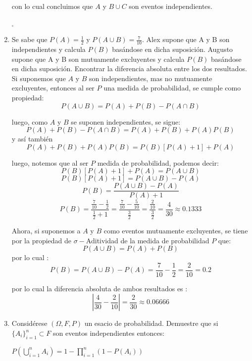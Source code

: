 \documentclass[12pt,a4paper]{report}
\begin{document}
\begin{enumerate}
{	con lo cual concluimos que $A$ y $B \cup C$ son eventos independientes.

	\begin{flushright}
		$_{\square}$
	\end{flushright}

	}

   \item {
   Se sabe que $P(A)= \frac{1}{2}$ y $P(A\cup B)=\frac{7}{10}$. Alex supone que A y B son independientes y calcula $P(B)$ basándose en dicha suposición. Augusto supone que A y B son mutuamente excluyentes y calcula $P(B)$ basándose en dicha suposición. Encontrar la diferencia absoluta entre los dos resultados.\\

   		Si suponemos que $A$ y $B$ son independientes, mas no mutuamente excluyentes,
		entonces al ser $P$ una medida de probabilidad, se cumple como propiedad:
			$$ P(A \cup B) = P(A) + P(B) - P(A \cap B)$$

		luego, como $A$ y $B$ se suponen independientes, se sigue:
			$$ P(A) + P(B) - P(A \cap B) = P(A) + P(B) + P(A)P(B) $$
		y así también
			$$ P(A) + P(B) + P(A)P(B) = P(B)[P(A) + 1] + P(A)  $$

		luego, notemos que al ser $P$ medida de probabilidad, podemos decir:
			$$ P(B)[P(A) + 1] + P(A) = P(A \cup B) $$
			$$ P(B)[P(A) + 1] = P(A \cup B) - P(A)$$
			$$ P(B) = \frac{P(A \cup B) - P(A)}{P(A) + 1} $$
			$$ P(B) = \frac{ \frac{7}{10} - \frac{1}{2} }{ \frac{1}{2} + 1}
			        = \frac{ \frac{7}{10} - \frac{5}{10} }{ \frac{3}{2}}
					= \frac{ \frac{2}{10} }{ \frac{3}{2}}
					= \frac{ 4 }{ 30 } \approx 0.1333 $$

		Ahora, si suponemos a $A$ y $B$ como eventos mutuamente excluyentes, se
		tiene por la propiedad de $\sigma -$Aditividad de la medida de probabilidad
		$P$ que:
			$$ P(A \cup B) = P(A) + P(B) $$
		por lo cual :
			$$ P(B) = P(A \cup B) - P(A) = \frac{7}{10} - \frac{1}{2} = \frac{2}{10} = 0.2  $$

		por lo cual la diferencia absoluta de ambos resultados es :
			$$ | \frac{4}{30} - \frac{2}{10} | = \frac{2}{30} \approx 0.06666 $$
	}

   \item {
   Considérese $(\Omega,F, P)$ un esacio de probabilidad. Demuestre que si $\lbrace A_{i} \rbrace _{i=1}^{n} \subset F$ son eventos independientes entonces:
   \begin{center}
   		$P(\bigcup\limits_{i=1}^{n} A_{i})=1-\prod\limits_{i=1}^{n} (1-P(A_{i}))$
   \end{center}

}
\end{enumerate}
\end{document}
